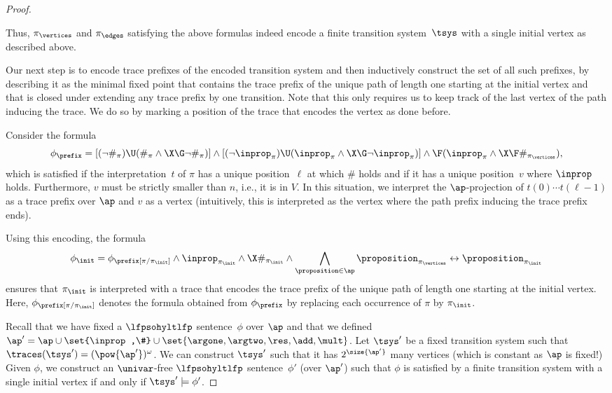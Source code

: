\begin{proof}
\begin{itemize}
\end{itemize}
Thus, $\pi_\vertices$ and $\pi_\edges$ satisfying the above formulas indeed encode a
finite transition system~$\tsys$ with a single initial vertex as described above.

Our next step is to encode trace prefixes of the encoded transition system and then inductively construct the set of all such prefixes, by describing it as the minimal fixed point that contains the trace prefix of the unique path of length one starting at the initial vertex and that is closed under extending any trace prefix by one transition. Note that this only requires us to keep track of the last vertex of the path inducing the trace. We do so by marking a position of the trace that encodes the vertex as done before.

 Consider the formula
	\[\phi_\prefix = 
    [(\neg\#_\pi) \U (\#_\pi \wedge \X\G\neg \#_\pi)] \wedge 
    [(\neg\inprop_\pi) \U (\inprop_\pi \wedge \X\G\neg \inprop_\pi)] \wedge 
    \F (\inprop_{\pi} \wedge \X\F \#_{\pi_\vertices})
	,\]
	 which is satisfied if the interpretation~$t$ of $\pi$ has a unique position~$\ell$ at which $\#$ holds and if it has a unique position~$v$ where $\inprop$ holds. Furthermore, $v$ must be strictly smaller than $n$, i.e., it is in $V$.
	In this situation, we interpret the $\ap$-projection of $t(0)\cdots t(\ell-1)$ as a trace prefix over $\ap$ and $v$ as a vertex (intuitively, this is interpreted as the vertex where the path prefix inducing the trace prefix ends).
	
    
	Using this encoding, the formula
	 \[
\phi_\init = \phi_\prefix[\pi/\pi_\init] \wedge \inprop_{\pi_\init} \wedge \X\#_{\pi_\init} \wedge \bigwedge_{\proposition \in \ap} \proposition_{\pi_\vertices} \leftrightarrow \proposition_{\pi_\init}
\]
ensures that $\pi_\init$ is interpreted with a trace that encodes the trace prefix of the unique path of length one starting at the initial vertex. Here, $\phi_\prefix[\pi/\pi_\init]$ denotes the formula obtained from $\phi_\prefix$ by replacing each occurrence of $\pi$ by $\pi_\init$.

Recall that we have fixed a $\lfpsohyltlfp$ sentence~$\phi$ over $\ap$ and that we defined $\ap' =  \ap \cup \set{\inprop,\#} \cup \set{\argone, \argtwo, \res, \add, \mult}$.
Let $\tsys'$ be a fixed transition system such that $\traces(\tsys') = (\pow{\ap'})^\omega$.
We can construct $\tsys'$ such that it has $2^{\size{\ap'}}$ many vertices (which is constant as $\ap$ is fixed!)
Given $\phi$, we construct an $\univar$-free $\lfpsohyltlfp$ sentence~$\phi'$ (over $\ap'$) such that $\phi$ is satisfied by a finite transition system with a single initial vertex if and only if $\tsys' \models\phi'$.


\end{proof}
